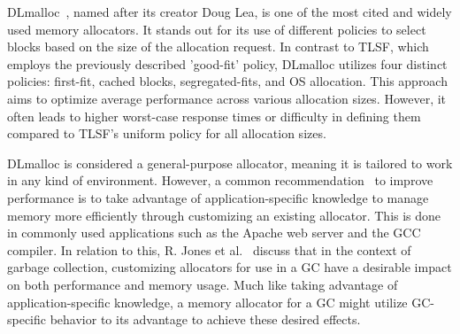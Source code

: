 

DLmalloc~\cite{dlmalloc}, named after its creator Doug Lea, is one of the most cited and widely used memory allocators. It stands out for its use of different policies to select blocks based on the size of the allocation request. In contrast to TLSF, which employs the previously described 'good-fit' policy, DLmalloc utilizes four distinct policies: first-fit, cached blocks, segregated-fits, and OS allocation. This approach aims to optimize average performance across various allocation sizes. However, it often leads to higher worst-case response times or difficulty in defining them compared to TLSF's uniform policy for all allocation sizes.

DLmalloc is considered a general-purpose allocator, meaning it is tailored to work in any kind of environment. However, a common recommendation~\cite{custom_rec_1, custom_rec_2} to improve performance is to take advantage of application-specific knowledge to manage memory more efficiently through customizing an existing allocator. This is done in commonly used applications such as the Apache web server and the GCC compiler. In relation to this, R. Jones et al.~\cite{gchandbook} discuss that in the context of garbage collection, customizing allocators for use in a GC have a desirable impact on both performance and memory usage. Much like taking advantage of application-specific knowledge, a memory allocator for a GC might utilize GC-specific behavior to its advantage to achieve these desired effects.

\newpage



